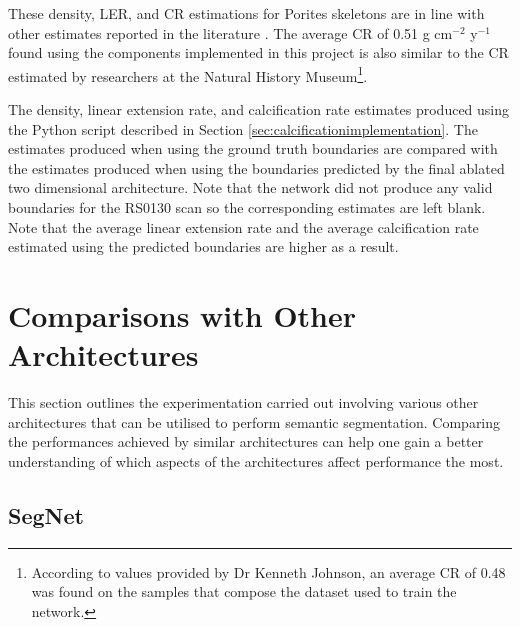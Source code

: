 These density, LER, and CR estimations for Porites skeletons are in line with other estimates reported in the literature \cite{calcification1, calcification2}. The average CR of 0.51 g cm$^{-2}$ y$^{-1}$ found using the components implemented in this project is also similar to the CR estimated by researchers at the Natural History Museum\footnote{According to values provided by Dr Kenneth Johnson, an average CR of 0.48 was found on the samples that compose the dataset used to train the network.}.



\begin{table}[!t]
    \centering
    \caption{The density, linear extension rate, and calcification rate estimates produced using the Python script described in Section \ref{sec:calcificationimplementation}. The estimates produced when using the ground truth boundaries are compared with the estimates produced when using the boundaries predicted by the final ablated two dimensional architecture. Note that the network did not produce any valid boundaries for the RS0130 scan so the corresponding estimates are left blank. Note that the average linear extension rate and the average calcification rate estimated using the predicted boundaries are higher as a result.}
    \small
    
    \label{tab:calcification}
\end{table}

\section{Comparisons with Other Architectures}

This section outlines the experimentation carried out involving various other architectures that can be utilised to perform semantic segmentation. Comparing the performances achieved by similar architectures can help one gain a better understanding of which aspects of the architectures affect performance the most.

\subsection{SegNet}

